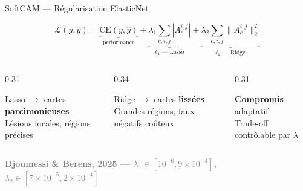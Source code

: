 \documentclass[10pt]{beamer}
\newcommand{\source}[1]{\vspace{6pt}\hfill{\textcolor{gray}{\textbf{\tiny #1}}}}
\begin{document}
\begin{frame}{SoftCAM --- Régularisation ElasticNet}
  \begin{tcolorbox}[
    colback=blue!3, colframe=blue!40!black,
    arc=2mm, boxrule=0.5pt, fonttitle=\bfseries,
    title={Loss augmentée (Eq. 5)}]
    \[
      \mathcal{L}(y, \hat{y}) = \underbrace{\text{CE}(y, \hat{y})}_{\text{performance}}
      + \underbrace{\lambda_1 \sum_{c,i,j} |A_c^{i,j}|}_{\ell_1 \text{ --- Lasso}}
      + \underbrace{\lambda_2 \sum_{c,i,j} \|A_c^{i,j}\|_2^2}_{\ell_2 \text{ --- Ridge}}
    \]
  \end{tcolorbox}

  \begin{columns}
    \begin{column}{0.31\textwidth}
      \begin{tcolorbox}[
        colback=orange!3, colframe=orange!50!black,
        arc=2mm, boxrule=0.5pt, fonttitle=\bfseries,
        title={Sparse SoftCAM ($\lambda_1 > 0$)}, halign title=center]
        \centering
        Lasso $\to$ cartes \textbf{parcimonieuses}\\[4pt]
        Lésions focales, régions précises
      \end{tcolorbox}
    \end{column}
    \begin{column}{0.34\textwidth}
      \begin{tcolorbox}[
        colback=blue!3, colframe=blue!40!black,
        arc=2mm, boxrule=0.5pt, fonttitle=\bfseries,
        title={Dense SoftCAM ($\lambda_2 > 0$)}, halign title=center]
        \centering
        Ridge $\to$ cartes \textbf{lissées}\\[4pt]
        Grandes régions, faux négatifs coûteux
      \end{tcolorbox}
    \end{column}
    \begin{column}{0.31\textwidth}
      \begin{tcolorbox}[
        colback=green!3, colframe=green!40!black,
        arc=2mm, boxrule=0.5pt, fonttitle=\bfseries,
        title={ElasticNet ($\lambda_1 + \lambda_2$)}, halign title=center]
        \centering
        \textbf{Compromis} adaptatif\\[4pt]
        Trade-off contrôlable par $\lambda$
      \end{tcolorbox}
    \end{column}
  \end{columns}

  \source{Djoumessi \& Berens, 2025 --- $\lambda_1 \in [10^{-6}, 9\times10^{-4}]$, $\lambda_2 \in [7\times10^{-5}, 2\times10^{-4}]$}
\end{frame}
\end{document}

